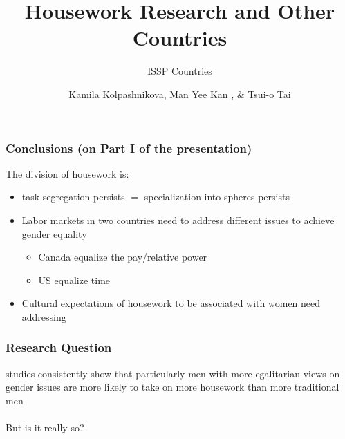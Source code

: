 \documentclass{beamer}
\begin{document}
\begin{frame}
\frametitle{Conclusions (on Part I of the presentation)}

The division of housework is: 
 \\

\begin{itemize}
\item task segregation persists $=$ specialization into spheres persists
\item Labor markets in two countries need to address different issues to achieve gender equality 
\begin{itemize}
\item Canada \rightarrow equalize the pay/relative power
\item US \rightarrow equalize time
\end{itemize}
\item Cultural expectations of housework to be associated with women need addressing
\end{itemize}

\end{frame}

\title[Housework Research] %
{Housework Research and Other Countries}
 
\subtitle{ISSP Countries}

\author[Kolpashnikova, Kamila] %
{Kamila Kolpashnikova, Man Yee Kan , \& Tsui-o Tai }
 

\begin{frame}
\maketitle
\end{frame}

\begin{frame}
\frametitle{Research Question}

studies consistently show that particularly men with more egalitarian views on gender issues are more likely to take on more housework than more traditional men
 \\~\\

But is it really so?

\end{frame}
\end{document}
